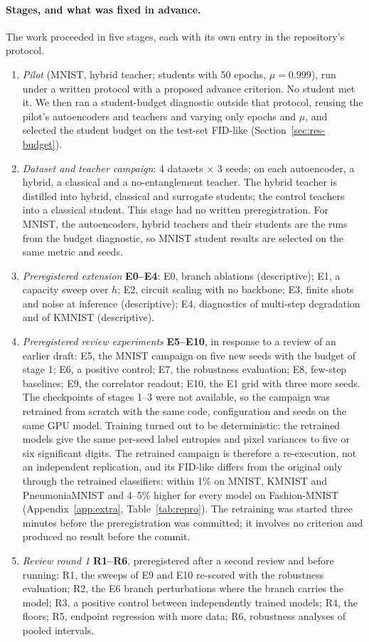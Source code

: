 \documentclass[11pt]{article}
\newcommand{\fidlike}{FID-like}
\begin{document}
\paragraph{Stages, and what was fixed in advance.} The work proceeded in
five stages, each with its own entry in the repository's protocol.
\begin{enumerate}
  \item \emph{Pilot} (MNIST, hybrid teacher; students with 50 epochs,
  $\mu=0.999$), run under a written protocol with a proposed advance criterion.
  No student met it. We then ran a student-budget diagnostic outside that
  protocol, reusing the pilot's autoencoders and teachers and varying only epochs
  and $\mu$, and selected the student budget on the test-set \fidlike{}
  (Section~\ref{sec:res-budget}).
  \item \emph{Dataset and teacher campaign}: 4 datasets $\times$ 3 seeds; on each
  autoencoder, a hybrid, a classical and a no-entanglement teacher. The hybrid
  teacher is distilled into hybrid, classical and surrogate students; the
  control teachers into a classical student. This stage had no written
  preregistration. For MNIST, the autoencoders, hybrid teachers and their students
  are the runs from the budget diagnostic, so MNIST student results are selected
  on the same metric and seeds.
  \item \emph{Preregistered extension} \textbf{E0--E4}: E0, branch ablations
  (descriptive); E1, a capacity sweep over $h$; E2, circuit scaling with no
  backbone; E3, finite shots and noise at inference (descriptive); E4,
  diagnostics of multi-step degradation and of KMNIST (descriptive).
  \item \emph{Preregistered review experiments} \textbf{E5--E10}, in response to a
  review of an earlier draft: E5, the MNIST campaign on five new seeds with the
  budget of stage 1; E6, a positive control; E7, the robustness evaluation; E8,
  few-step baselines; E9, the correlator readout; E10, the E1 grid with three more
  seeds. The checkpoints of stages 1--3 were not available, so the campaign was
  retrained from scratch with the same code, configuration and seeds on the same
  GPU model. Training turned out to be deterministic: the retrained models give
  the same per-seed label entropies and pixel variances to five or six significant
  digits. The retrained campaign is therefore a re-execution, not an independent
  replication, and its \fidlike{} differs from the original only through the
  retrained classifiers: within 1\% on MNIST, KMNIST and PneumoniaMNIST and 4--5\%
  higher for every model on Fashion-MNIST (Appendix~\ref{app:extra},
  Table~\ref{tab:repro}). The retraining was started three minutes before the
  preregistration was committed; it involves no criterion and produced no result
  before the commit.
  \item \emph{Review round 1} \textbf{R1--R6}, preregistered after a second review
  and before running: R1, the sweeps of E9 and E10 re-scored with the robustness
  evaluation; R2, the E6 branch perturbations where the branch carries the model;
  R3, a positive control between independently trained models; R4, the floors;
  R5, endpoint regression with more data; R6, robustness analyses of pooled
  intervals.
\end{enumerate}
\end{document}
